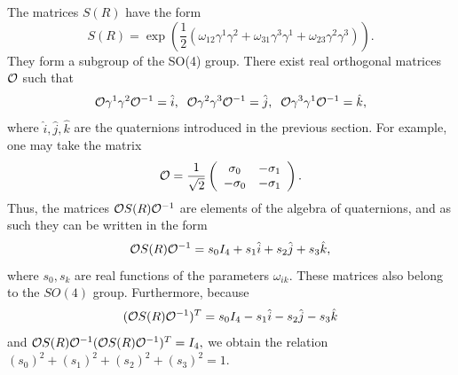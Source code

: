 \documentclass[12pt]{article}
\begin{document}
The matrices $S(R)$ have the form 
\[  S(R) =  \exp(\frac{1}{2} (\omega_{12} \gamma^1\gamma^2 + \omega_{31} \gamma^3\gamma^1 +  \omega_{23} \gamma^2\gamma^3)).  \]
They form a subgroup of the SO(4) group. 
There exist real orthogonal  matrices ${\cal O}$ such that 
\[ {\cal O} \gamma^1 \gamma^2 {\cal O}^{-1} = \hat{i}, \;\;    {\cal O} \gamma^2 \gamma^3 {\cal O}^{-1} = \hat{j}, \;\;  {\cal O} \gamma^3 \gamma^1 {\cal O}^{-1} = \hat{k},   \]   
where $\hat{i}, \hat{j}, \hat{k}$ are the quaternions introduced in the previous section. For example, one may take  the matrix
\[{\cal O} = \frac{1}{\sqrt{2}}  \left(\begin{array}{cc} \sigma_0 & - \sigma_1\\
- \sigma_0 & -\sigma_1 \end{array} \right). \]
Thus, the matrices  ${\cal O} S(R) {\cal O}^{-1}$  are elements of the algebra of quaternions, and as such they can be written  in the form
\begin{equation} {\cal O} S(R) {\cal O}^{-1} = s_0 I_4 + s_1 \hat{i} + s_2 \hat{j} + s_3 \hat{k}, \end{equation}
where $s_0, s_k$ are real functions of the   parameters $\omega_{ik}$.  These matrices also belong to the $SO(4)$ group. Furthermore,  because
\[ ({\cal O} S(R) {\cal O}^{-1})^T = s_0 I_4 - s_1 \hat{i} -  s_2 \hat{j}  - s_3 \hat{k}\] 
and  ${\cal O} S(R) {\cal O}^{-1}  ({\cal O} S(R) {\cal O}^{-1})^{T} = I_4,$
we obtain the  relation  $(s_0)^2 + (s_1)^2 + (s_2)^2 + (s_3)^2 =1$. 
\end{document}
